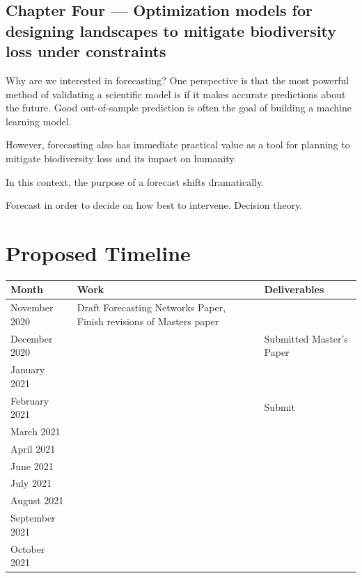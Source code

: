 \documentclass[]{article}
\begin{document}
\subsection{Chapter Four --- Optimization models for designing landscapes to mitigate biodiversity loss under constraints }

Why are we interested in forecasting? One perspective is that the most powerful method of validating a scientific model is if it makes accurate predictions about the future. Good out-of-sample prediction is often the goal of building a machine learning model.

However, forecasting also has immediate practical value as a tool for planning to mitigate biodiversity loss and its impact on humanity.

In this context, the purpose of a forecast shifts dramatically. 

Forecast in order to decide on how best to intervene. 
Decision theory. 



\clearpage
\section{Proposed Timeline}
\begin{table}[H]
\begin{tabular}{lll}
Month          & Work  & Deliverables \\ \hline
November 2020  & Draft Forecasting Networks Paper, Finish revisions of Masters paper &                                   \\
December 2020  &                                                                     & Submitted Master's Paper          \\
January 2021   &                                                                     &                                   \\
February 2021  &                                                                     & Submit                            \\
March 2021     &                                                                     &                                   \\
April 2021     &                                                                     &                                   \\
June 2021      &                                                                     &                                   \\
July 2021      &                                                                     &                                   \\
August 2021    &                                                                     &                                   \\
September 2021 &                                                                     &                                   \\
October 2021   &                                                                     &                                  
\end{tabular}
\end{table}
\end{document}
